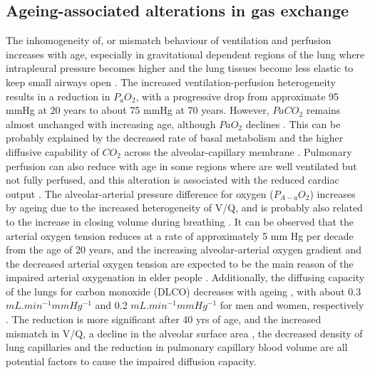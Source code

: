 \subsection{Ageing-associated alterations in gas exchange}
The inhomogeneity of, or mismatch behaviour of ventilation and perfusion increases with age, especially in gravitational dependent regions of the lung where intrapleural pressure becomes higher and the lung tissues become less elastic to keep small airways open \citep{holland1968regional, paoletti1985reference, lalley2013aging}. The increased ventilation-perfusion heterogeneity results in a reduction in $P_a O_2$, with a progressive drop from approximate 95 mmHg at 20 years to about 75 mmHg at 70 years. However, $Pa CO_2$ remains almost unchanged with increasing age, although $Pa O_2$ declines \citep{wahba1983influence, sprung2006age}. This can be probably explained by the decreased rate of basal metabolism and the higher diffusive capability of $CO_2$ across the alveolar-capillary membrane \citep{ levitzky1984effects}. Pulmonary perfusion can also reduce with age in some regions where are well ventilated but not fully perfused, and this alteration is associated with the reduced cardiac output \citep{levitzky1984effects,lalley2013aging}. The alveolar-arterial pressure difference for oxygen ($P_{A-a} O_2$) increases by ageing due to the increased heterogeneity of V/Q, and is probably also related to the increase in closing volume during breathing \citep{janssens1999physiological}. It can be observed that the arterial oxygen tension reduces at a rate of approximately 5 mm Hg per decade from the age of 20 years, and the increasing alveolar-arterial oxygen gradient and the decreased arterial oxygen tension are expected to be the main reason of the impaired arterial oxygenation in elder people \citep{smith1986respiratory,zaugg2000respiratory}. Additionally, the diffusing capacity of the lungs for carbon monoxide (DLCO) decreases with ageing \citep{guenard1996pulmonary}, with about 0.3 $mL.min^{-1}mmHg^{-1}$ and 0.2 $mL.min^{-1}mmHg^{-1}$ for men and women, respectively \citep{murray1986normal}. The reduction is more significant after 40 yrs of age, and the increased mismatch in V/Q, a decline in the alveolar surface area \citep{verbeken1992senile, thurlbeck1975growth}, the decreased density of lung capillaries \citep{butler1970capillary} and the reduction in pulmonary capillary blood volume \citep{guenard1996pulmonary} are all potential factors to cause the impaired diffusion capacity.

